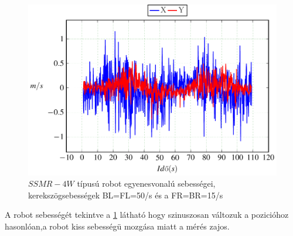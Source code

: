 \begin{figure}[H]
\begin{center}
  \includegraphics[scale=0.8]{tikz/KorP0705e.pdf}
\end{center}
  \caption{$SSMR-4W$ típusú robot egyenesvonalú sebességei, kerekszögsebességek BL=FL=50\degree/s és a FR=BR=15\degree/s}
  \label{fig:KorP0705e}
\end{figure}

A robot sebességét tekintve a \ref{fig:KorP0705e} látható hogy szinuszosan változuk a pozicióhoz hasonlóan,a robot kiss sebességü mozgása miatt a mérés zajos.
